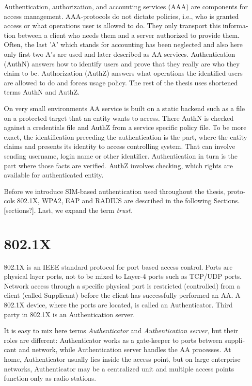 \documentclass[12pt,a4paper,english]{tutthesis}
\begin{document}
\begin{otherlanguage}{english}
Authentication, authorization, and accounting services (AAA) are
components for access management.  AAA-protocols do not dictate
policies, i.e., who is granted access or what operations user is
allowed to do. They only transport this information between a client
who needs them and a server authorized to provide them.
Often, the last 'A' which stands for accounting has been neglected
and also here only first two A's are used and later described as AA
services. Authentication (AuthN) answers how to identify users and
prove that they really are who they claim to be. Authorization (AuthZ)
answers what operations the identified users are allowed to do and
forces usage policy. The rest of the thesis uses shortened terms AuthN
and AuthZ.

On very small environments AA service is built on a static backend such
as a file on a protected target that an entity wants to access. There AuthN
is checked against a credentials file and AuthZ from a service
specific policy file. 
To be more exact, the identification preceding the authentication is the part,
where the entity claims and presents its identity to 
access controlling system. That can involve sending username, login
name or other identifier. Authentication in turn is the part where
those facts are verified. AuthZ involves checking, which rights are 
available for authenticated entity. 


Before we introduce SIM-based authentication used throughout the
thesis, protocols 802.1X, WPA2, EAP and RADIUS are described in the
following Sections. [sections?]. Last, we expand the term \emph{trust}.

\section{802.1X}
\label{sec-2-1}

802.1X\cite{8021X} is an IEEE standard protocol for port based access
control. Ports are physical layer ports, not to be mixed to Layer-4 ports such as TCP/UDP ports.
 Network access through a specific physical port is
restricted (controlled) from a client (called Supplicant) before
the client has successfully performed an AA. A 802.1X device, where
the ports are located, is called an Authenticator. Third party in 802.1X is an
Authentication server. 



It is easy to mix here terms \emph{Authenticator} and \emph{Authentication
server}, but their roles are different: Authenticator works as a
gate-keeper to ports between supplicant and network, while
Authentication server handles the AA processes.
At home, Authenticator usually lies inside the access point, but 
on large enterprise networks, Authenticator may be a centralized unit 
and multiple access points function only as radio stations.




\end{otherlanguage}
\end{document}
